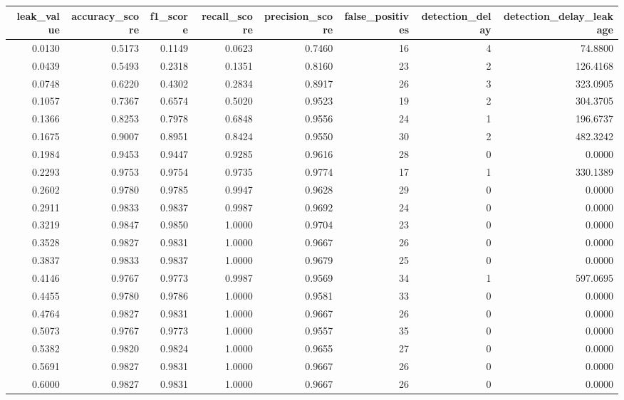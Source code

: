\begin{tabular}{rrrrrrrr}
\toprule
leak\_value & accuracy\_score & f1\_score & recall\_score & precision\_score & false\_positives & detection\_delay & detection\_delay\_leakage \\
\midrule
0.0130 & 0.5173 & 0.1149 & 0.0623 & 0.7460 & 16 & 4 & 74.8800 \\
0.0439 & 0.5493 & 0.2318 & 0.1351 & 0.8160 & 23 & 2 & 126.4168 \\
0.0748 & 0.6220 & 0.4302 & 0.2834 & 0.8917 & 26 & 3 & 323.0905 \\
0.1057 & 0.7367 & 0.6574 & 0.5020 & 0.9523 & 19 & 2 & 304.3705 \\
0.1366 & 0.8253 & 0.7978 & 0.6848 & 0.9556 & 24 & 1 & 196.6737 \\
0.1675 & 0.9007 & 0.8951 & 0.8424 & 0.9550 & 30 & 2 & 482.3242 \\
0.1984 & 0.9453 & 0.9447 & 0.9285 & 0.9616 & 28 & 0 & 0.0000 \\
0.2293 & 0.9753 & 0.9754 & 0.9735 & 0.9774 & 17 & 1 & 330.1389 \\
0.2602 & 0.9780 & 0.9785 & 0.9947 & 0.9628 & 29 & 0 & 0.0000 \\
0.2911 & 0.9833 & 0.9837 & 0.9987 & 0.9692 & 24 & 0 & 0.0000 \\
0.3219 & 0.9847 & 0.9850 & 1.0000 & 0.9704 & 23 & 0 & 0.0000 \\
0.3528 & 0.9827 & 0.9831 & 1.0000 & 0.9667 & 26 & 0 & 0.0000 \\
0.3837 & 0.9833 & 0.9837 & 1.0000 & 0.9679 & 25 & 0 & 0.0000 \\
0.4146 & 0.9767 & 0.9773 & 0.9987 & 0.9569 & 34 & 1 & 597.0695 \\
0.4455 & 0.9780 & 0.9786 & 1.0000 & 0.9581 & 33 & 0 & 0.0000 \\
0.4764 & 0.9827 & 0.9831 & 1.0000 & 0.9667 & 26 & 0 & 0.0000 \\
0.5073 & 0.9767 & 0.9773 & 1.0000 & 0.9557 & 35 & 0 & 0.0000 \\
0.5382 & 0.9820 & 0.9824 & 1.0000 & 0.9655 & 27 & 0 & 0.0000 \\
0.5691 & 0.9827 & 0.9831 & 1.0000 & 0.9667 & 26 & 0 & 0.0000 \\
0.6000 & 0.9827 & 0.9831 & 1.0000 & 0.9667 & 26 & 0 & 0.0000 \\
\bottomrule
\end{tabular}
